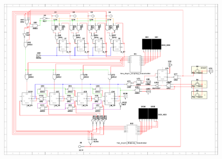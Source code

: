 \documentclass[a4paper]{article}
\begin{document}
\begin{figure}[H]
    \centering
    \includegraphics[width=\textwidth]{lab2-alt.pdf}
\end{figure}
\end{document}
